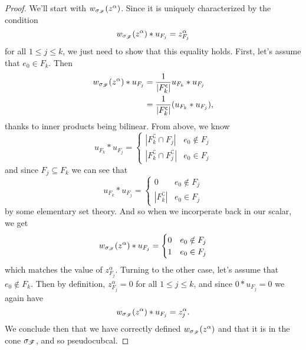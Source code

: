 \documentclass[12pt,oneside]{../../sfsuthesis}
\begin{document}
\begin{proof}
    We'll start with \( w_{\sigma_{\mathscr{F}}}(z^\alpha) \).
    Since it is uniquely characterized by the condition
    \[
        w_{\sigma_{\mathscr{F}}}(z^\alpha) \ast u_{F_j} = z^\alpha_{F_j}
    \]
    for all \( 1 \leq j \leq k \), we just need to show that this equality holds.
    First, let's assume that \( e_0 \in F_k \).
    Then
    \begin{align*}
        w_{\sigma_{\mathscr{F}}}(z^\alpha) \ast u_{F_j} & = {\frac{1}{|F_k^{\mathsf{c}}|}}u_{F_k} \ast u_{F_j}    \\
                                                & = {\frac{1}{|F_k^{\mathsf{c}}|}}(u_{F_k} \ast u_{F_j}),
    \end{align*}
    thanks to inner products being bilinear.
    From above, we know
    \[
        u_{F_k} \ast u_{F_j} = \begin{cases}
            |F_k^\complement \cap F_j|             & e_0 \notin F_j \\
            |F_k^\complement \cap F_j^\complement| & e_0 \in F_j
        \end{cases}
    \]
    and since \( F_j \subseteq F_k \) we can see that
    \[
        u_{F_k} \ast u_{F_j} = \begin{cases}
            0                 & e_0 \notin F_j \\
            |F_k^\complement| & e_0 \in F_j
        \end{cases}
    \]
    by some elementary set theory.
    And so when we incorperate back in our scalar, we get
    \[
        w_{\sigma_{\mathscr{F}}}(z^\alpha) \ast u_{F_j} = \begin{cases}
            0 & e_0 \notin F_j \\
            1 & e_0 \in F_j
        \end{cases}
    \]
    which matches the value of \( z^\alpha_{F_j} \).
    Turning to the other case, let's assume that \( e_0 \notin F_k \).
    Then by definition, \( z^\alpha_{F_j} = 0 \) for all \( 1 \leq j \leq k \), and since \( 0 \ast u_{F_j} = 0 \) we again have
    \[
        w_{\sigma_{\mathscr{F}}}(z^\alpha) \ast u_{F_j} = z^\alpha_j.
    \]
    We conclude then that we have correctly defined \( w_{\sigma_{\mathscr{F}}}(z^\alpha) \) and that it is in the cone \( \sigma_{\mathscr{F}} \), and so pseudocubcal.


\end{proof}
\end{document}
